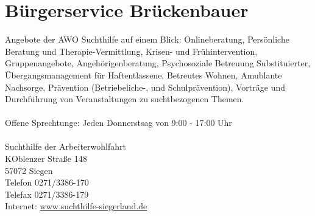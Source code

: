 \section{Bürgerservice Brückenbauer}
Angebote der AWO Suchthilfe auf einem Blick: Onlineberatung, Persönliche Beratung und Therapie-Vermittlung, Krisen- und Frühintervention, Gruppenangebote, Angehörigenberatung, Psychosoziale Betreuung Substituierter, Übergangsmanagement für Haftentlassene, Betreutes Wohnen, Amublante Nachsorge, Prävention (Betriebeliche-, und Schulprävention), Vorträge und Durchführung von Veranstaltungen zu suchtbezogenen Themen.\\
\\
Offene Sprechtunge: Jeden Donnerstsag von 9:00 - 17:00 Uhr\\
\\
Suchthilfe der Arbeiterwohlfahrt\\
KOblenzer Straße 148\\
57072 Siegen\\
Telefon 0271/3386-170\\
Telefax 0271/3386-179\\
Internet: \href{www.suchthilfe-siegerland.de}{www.suchthilfe-siegerland.de}  